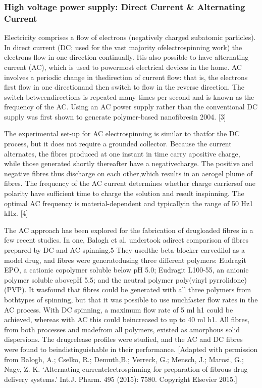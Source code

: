 \documentclass[5p,,preprint,12pt,twocolumn]{elsarticle}
\begin{document}
\subsubsection{High voltage power supply: Direct Current \& Alternating Current}Electricity comprises a flow of electrons (negatively charged subatomic particles). In direct current (DC; used for the vast majority ofelectrospinning work) the electrons flow in one direction continually. Itis also possible to have alternating current (AC), which is used to powermost electrical devices in the home. AC involves a periodic change in thedirection of current flow: that is, the electrons first flow in one directionand then switch to flow in the reverse direction. The switch betweendirections is repeated many times per second and is known as the frequency of the AC. Using an AC power supply rather than the conventional DC supply was first shown to generate polymer-based nanofibresin 2004. [3]

The experimental set-up for AC electrospinning is similar to thatfor the DC process, but it does not require a grounded collector. Because the current alternates, the fibres produced at one instant in time carry apositive charge, while those generated shortly thereafter have a negativecharge. The positive and negative fibres thus discharge on each other,which results in an aerogel plume of fibres. The frequency of the AC current determines whether charge carriersof one polarity have sufficient time to charge the solution and result inspinning. The optimal AC frequency is material-dependent and typicallyin the range of 50 Hz{\textendash}1 kHz. [4]

The AC approach has been explored for the fabrication of drugloaded fibres in a few recent studies. In one, Balogh et al. undertook adirect comparison of fibres prepared by DC and AC spinning.5 They usedthe beta-blocker carvedilol as a model drug, and fibres were generatedusing three different polymers: Eudragit EPO, a cationic copolymer soluble below pH 5.0; Eudragit L100-55, an anionic polymer soluble abovepH 5.5; and the neutral polymer poly(vinyl pyrrolidone) (PVP). It wasfound that fibres could be generated with all three polymers from bothtypes of spinning, but that it was possible to use muchfaster flow rates in the AC process. With DC spinning, a maximum flow rate of 5 ml h{\textendash}1 could be achieved, whereas with AC this could beincreased to up to 40 ml h{\textendash}1. All fibres, from both processes and madefrom all polymers, existed as amorphous solid dispersions. The drugrelease profiles were studied, and the AC and DC fibres were found to beindistinguishable in their performance. [Adapted with permission from Balogh, A.; Cselko, R.; Demuth,B.; Verreck, G.; Mensch, J.; Marosi, G.; Nagy, Z. K. `Alternating currentelectrospinning for preparation of fibrous drug delivery systems.' Int.J. Pharm. 495 (2015): 75{\textendash}80. Copyright Elsevier 2015.]
\end{document}
